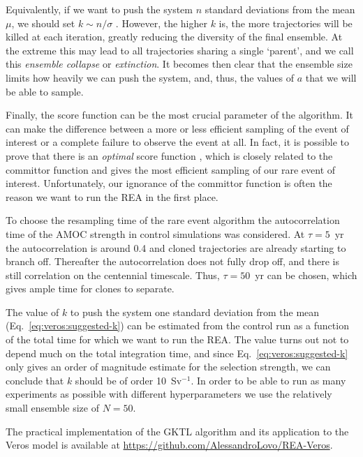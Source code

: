 Equivalently, if we want to push the system $n$ standard deviations from the mean $\mu$, we should set $k \sim n/\sigma$ \cite{PRI24}. However, the higher $k$ is, the more trajectories will be killed at each iteration, greatly reducing the diversity of the final ensemble. At the extreme this may lead to all trajectories sharing a single `parent', and we call this \emph{ensemble collapse} or \emph{extinction}. It becomes then clear that the ensemble size limits how heavily we can push the system, and, thus, the values of $a$ that we will be able to sample.

Finally, the score function can be the most crucial parameter of the algorithm. It can make the difference between a more or less efficient sampling of the event of interest or a complete failure to observe the event at all.
In fact, it is possible to prove that there is an \emph{optimal} score function \cite{CHR20}, which is closely related to the committor function and gives the most efficient sampling of our rare event of interest.
Unfortunately, our ignorance of the committor function is often the reason we want to run the REA in the first place.

To choose the resampling time of the rare event algorithm the autocorrelation time of the AMOC strength in control simulations was considered. At $\tau = 5$~yr the autocorrelation is around 0.4 and cloned trajectories are already starting to branch off. 
Thereafter the autocorrelation does not fully drop off, and there is still correlation on the centennial timescale. Thus, $\tau = 50$~yr can be chosen, which gives ample time for clones to separate.

The value of $k$ to push the system one standard deviation from the mean (Eq.~\ref{eq:veros:suggested-k}) can be estimated from the control run as a function of the total time for which we want to run the REA. The value turns out not to depend much on the total integration time, and since Eq.~\ref{eq:veros:suggested-k} only gives an order of magnitude estimate for the selection strength, we can conclude that $k$ should be of order 10~Sv$^{-1}$. In order to be able to run as many experiments as possible with different hyperparameters we use the relatively small ensemble size of $N = 50$.


The practical implementation of the GKTL algorithm and its application to the Veros model is available at \url{https://github.com/AlessandroLovo/REA-Veros}.
